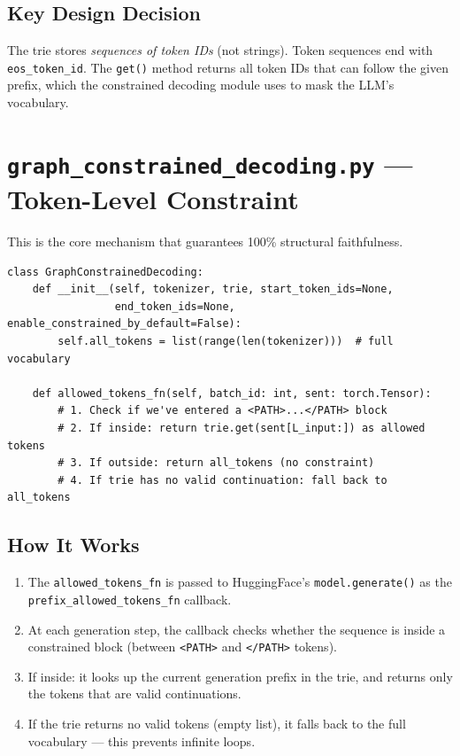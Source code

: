\documentclass[11pt,a4paper,oneside,openany]{book}
\theoremstyle{definition}
\newcommand{\code}[1]{\texttt{#1}}
\begin{document}
\subsection{Key Design Decision}

The trie stores \emph{sequences of token IDs} (not strings). Token sequences end with \code{eos\_token\_id}. The \code{get()} method returns all token IDs that can follow the given prefix, which the constrained decoding module uses to mask the LLM's vocabulary.

\section{\texttt{graph\_constrained\_decoding.py} --- Token-Level Constraint}

This is the core mechanism that guarantees 100\% structural faithfulness.

\begin{lstlisting}
class GraphConstrainedDecoding:
    def __init__(self, tokenizer, trie, start_token_ids=None,
                 end_token_ids=None, enable_constrained_by_default=False):
        self.all_tokens = list(range(len(tokenizer)))  # full vocabulary

    def allowed_tokens_fn(self, batch_id: int, sent: torch.Tensor):
        # 1. Check if we've entered a <PATH>...</PATH> block
        # 2. If inside: return trie.get(sent[L_input:]) as allowed tokens
        # 3. If outside: return all_tokens (no constraint)
        # 4. If trie has no valid continuation: fall back to all_tokens
\end{lstlisting}

\subsection{How It Works}

\begin{enumerate}
	\item The \code{allowed\_tokens\_fn} is passed to HuggingFace's \code{model.generate()} as the \code{prefix\_allowed\_tokens\_fn} callback.
	\item At each generation step, the callback checks whether the sequence is inside a constrained block (between \code{<PATH>} and \code{</PATH>} tokens).
	\item If inside: it looks up the current generation prefix in the trie, and returns only the tokens that are valid continuations.
	\item If the trie returns no valid tokens (empty list), it falls back to the full vocabulary --- this prevents infinite loops.
\end{enumerate}
\end{document}
